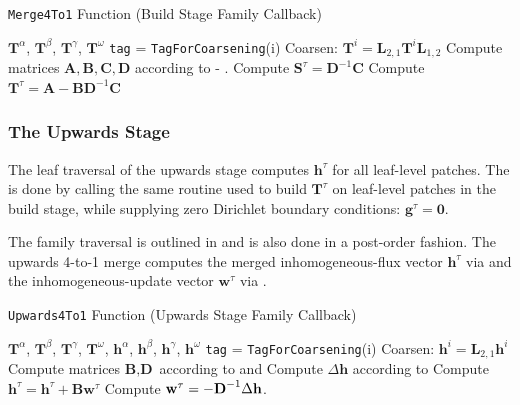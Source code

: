 \begin{algorithm}
    \caption{\texttt{Merge4To1} Function (Build Stage Family Callback)}
    \begin{algorithmic}[0]
        \Require $\textbf{T}^{\alpha}$, $\textbf{T}^{\beta}$, $\textbf{T}^{\gamma}$, $\textbf{T}^{\omega}$
            \State \texttt{tag} = \texttt{TagForCoarsening}(i)
                \State Coarsen: $\textbf{T}^{i} = \textbf{L}_{2,1} \textbf{T}^{i} \textbf{L}_{1,2}$
            \EndIf
        \EndFor
        \State Compute matrices $\textbf{A}, \textbf{B}, \textbf{C}, \textbf{D}$ according to  - . 
        \State Compute $\textbf{S}^{\tau} = \textbf{D}^{-1} \textbf{C}$
        \State Compute $\textbf{T}^{\tau} = \textbf{A} - \textbf{B} \textbf{D}^{-1} \textbf{C}$
    \end{algorithmic}
    \label{alg:build_merge}
\end{algorithm}

\subsubsection{The Upwards Stage}

The leaf traversal of the upwards stage computes $\textbf{h}^{\tau}$ for all leaf-level patches. The is done by calling the same routine used to build $\textbf{T}^{\tau}$ on leaf-level patches in the build stage, while supplying zero Dirichlet boundary conditions: $\textbf{g}^{\tau} = \textbf{0}$.

The family traversal is outlined in  and is also done in a post-order fashion. The upwards 4-to-1 merge computes the merged inhomogeneous-flux vector $\textbf{h}^{\tau}$ via  and the inhomogeneous-update vector $\textbf{w}^{\tau}$ via .

\begin{algorithm}
    \caption{\texttt{Upwards4To1} Function (Upwards Stage Family Callback)}
    \begin{algorithmic}[0]
        \Require $\textbf{T}^{\alpha}$, $\textbf{T}^{\beta}$, $\textbf{T}^{\gamma}$, $\textbf{T}^{\omega}$, $\textbf{h}^{\alpha}$, $\textbf{h}^{\beta}$, $\textbf{h}^{\gamma}$, $\textbf{h}^{\omega}$
        \State \texttt{tag} = \texttt{TagForCoarsening}(i)
        \State Coarsen: $\textbf{h}^{i} = \textbf{L}_{2,1} \textbf{h}^{i}$
        \EndIf
        \EndFor
        \State Compute matrices $\textbf{B}, \textbf{D}$ according to  and 
        \State Compute $\Delta \textbf{h}$ according to 
        \State Compute $\textbf{h}^{\tau} = \textbf{h}^{\tau} + \textbf{B} \textbf{w}^{\tau}$
        \State Compute $\textbf{w}^{\tau} = -\textbf{D}^{-1} \Delta \mathbf h$.
    \end{algorithmic}
    \label{alg:upwards_merge}
\end{algorithm}

